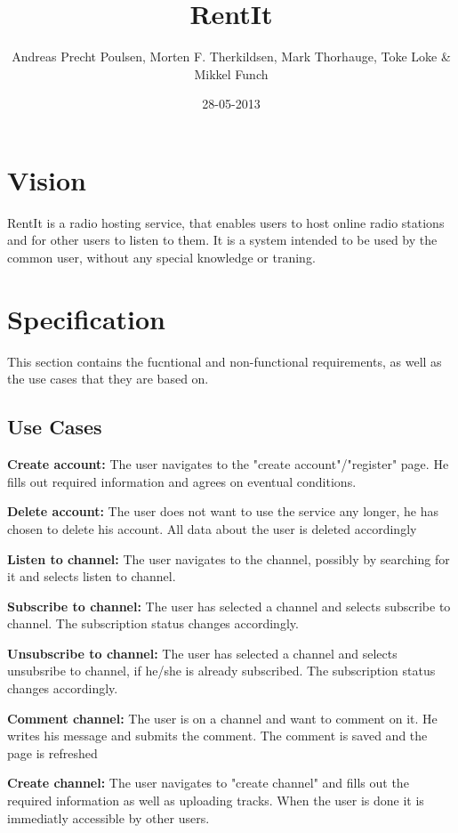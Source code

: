 \documentclass[a4paper,11pt,report]{article}
\begin{document}
\title{RentIt}
\author{Andreas Precht Poulsen, Morten F. Therkildsen, Mark Thorhauge, Toke Loke \& Mikkel Funch}
\date{28-05-2013}
\maketitle

\section{Vision}
RentIt is a radio hosting service, that enables users to host online radio stations and for other users to listen to them.
It is a system intended to be used by the common user, without any special knowledge or traning.

\section{Specification}
This section contains the fucntional and non-functional requirements, as well as the use cases that they are based on.
\subsection{Use Cases}
\textbf{Create account:}
The user navigates to the "create account"/"register" page. He fills out required information and agrees on eventual conditions.

\textbf{Delete account:}
The user does not want to use the service any longer, he has chosen to delete his account. All data about the user is deleted accordingly

\textbf{Listen to channel:}
The user navigates to the channel, possibly by searching for it and selects listen to channel.

\textbf{Subscribe to channel:}
The user has selected a channel and selects subscribe to channel. The subscription status changes accordingly.

\textbf{Unsubscribe to channel:}
The user has selected a channel and selects unsubsribe to channel, if he/she is already subscribed. The subscription status changes accordingly.

\textbf{Comment channel:}
The user is on a channel and want to comment on it. He writes his message and submits the comment. The comment is saved and the page is refreshed

\textbf{Create channel:}
The user navigates to "create channel" and fills out the required information as well as uploading tracks. When the user is done it is immediatly accessible by other users.
\end{document}
